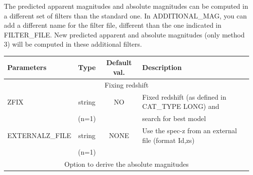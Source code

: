 \documentclass[12pt]{article}
\begin{document}
The predicted apparent magnitudes and absolute magnitudes can be computed in a different set of filters than the standard one. In ADDITIONAL\_MAG, you can add a different name for the filter file, different than the one indicated in FILTER\_FILE. New predicted apparent and absolute magnitudes (only method 3) will be computed in these additional filters.

\begin{tabular}{lccl}
\\[0.5cm]
\textbf{Parameters}     & \textbf{Type}    & \textbf{Default val.} &  \textbf{Description}                                             \\[5pt]
\hline
%
                          \multicolumn{4}{c}{ Fixing redshift }  \\ 
\hline 
ZFIX                   &  string  &  NO   &  Fixed redshift (as defined in CAT\_TYPE LONG)  and              \\
                           &  (n=1)  &          &  search for best model                                           \\
\hline 
EXTERNALZ\_FILE        &  string  &  NONE   &  Use the spec-z from an external file (format Id,zs)              \\
                           &  (n=1)  &          &                                            \\
\hline
                          \multicolumn{4}{c}{ Option to derive the absolute magnitudes}  \\ 
\hline 


\end{tabular}
\end{document}
